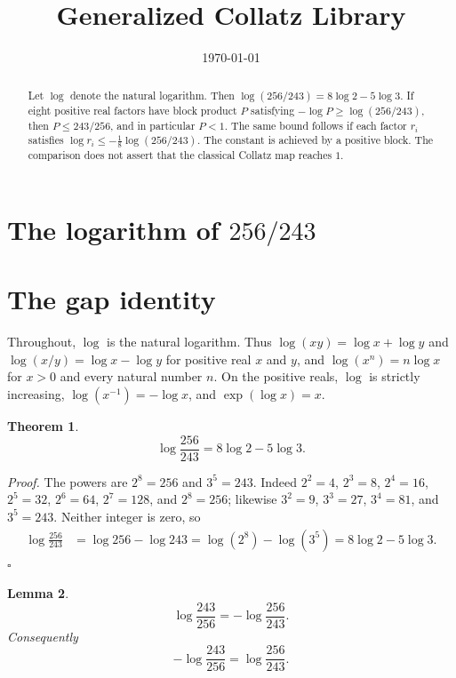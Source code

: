 \documentclass[11pt,letterpaper]{article}
\title{Generalized Collatz Library}
\author{}
\date{\today}
\newtheorem{theorem}{Theorem}
\newtheorem{lemma}[theorem]{Lemma}
\newenvironment{proof}{\noindent\textit{Proof.}}{\hfill\(\square\)}
\begin{document}
\maketitle
\section*{The logarithm of \(256/243\)}

\begin{abstract}
Let \(\log\) denote the natural logarithm. Then \(\log(256/243)=8\log 2-5\log 3\). If eight positive real factors have block product \(P\) satisfying \(-\log P\ge\log(256/243)\), then \(P\le 243/256\), and in particular \(P<1\). The same bound follows if each factor \(r_i\) satisfies
\(\log r_i\le-\frac18\log(256/243)\). The constant is achieved by a positive block. The comparison does not assert that the classical Collatz map reaches \(1\).
\end{abstract}

\section{The gap identity}

Throughout, \(\log\) is the natural logarithm. Thus \(\log(xy)=\log x+\log y\) and \(\log(x/y)=\log x-\log y\) for positive real \(x\) and \(y\), and \(\log(x^n)=n\log x\) for \(x>0\) and every natural number \(n\). On the positive reals, \(\log\) is strictly increasing, \(\log(x^{-1})=-\log x\), and \(\exp(\log x)=x\).

\begin{theorem}
\label{thm:identity}
\[
\log\frac{256}{243}=8\log 2-5\log 3.
\]
\end{theorem}

\begin{proof}
The powers are \(2^8=256\) and \(3^5=243\). Indeed \(2^2=4\), \(2^3=8\), \(2^4=16\), \(2^5=32\), \(2^6=64\), \(2^7=128\), and \(2^8=256\); likewise \(3^2=9\), \(3^3=27\), \(3^4=81\), and \(3^5=243\). Neither integer is zero, so
\begin{align*}
\log\frac{256}{243}
&=\log 256-\log 243
=\log(2^8)-\log(3^5)
=8\log 2-5\log 3.
\end{align*}
\end{proof}

\begin{lemma}
\label{lem:reciprocal}
\[
\log\frac{243}{256}=-\log\frac{256}{243}.
\]
Consequently
\[
-\log\frac{243}{256}=\log\frac{256}{243}.
\]
\end{lemma}
\end{document}

